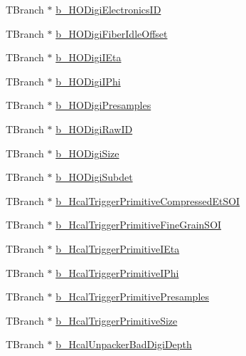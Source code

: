 \begin{DoxyCompactItemize}
\item 
T\+Branch $\ast$ \hyperlink{class_hcal_tuple_tree_a3e97d7440c8cafed91eb928ba1b76455}{b\+\_\+\+H\+O\+Digi\+Electronics\+I\+D}
\item 
T\+Branch $\ast$ \hyperlink{class_hcal_tuple_tree_a5e0d32424ae14cfd4499eeaaaeadf8a0}{b\+\_\+\+H\+O\+Digi\+Fiber\+Idle\+Offset}
\item 
T\+Branch $\ast$ \hyperlink{class_hcal_tuple_tree_ab0259ff430dca03ae316aedeaf2870f5}{b\+\_\+\+H\+O\+Digi\+I\+Eta}
\item 
T\+Branch $\ast$ \hyperlink{class_hcal_tuple_tree_a5311dcb724f54bb7398654b1f367aaca}{b\+\_\+\+H\+O\+Digi\+I\+Phi}
\item 
T\+Branch $\ast$ \hyperlink{class_hcal_tuple_tree_a04520870887cc734f0a01b82f13256b3}{b\+\_\+\+H\+O\+Digi\+Presamples}
\item 
T\+Branch $\ast$ \hyperlink{class_hcal_tuple_tree_aa09860c5b5f92fca14aec01d696674f8}{b\+\_\+\+H\+O\+Digi\+Raw\+I\+D}
\item 
T\+Branch $\ast$ \hyperlink{class_hcal_tuple_tree_a80b9b38ae544d61182fa930565e2d517}{b\+\_\+\+H\+O\+Digi\+Size}
\item 
T\+Branch $\ast$ \hyperlink{class_hcal_tuple_tree_ad03aeb309f6aebb9f82151259522bf11}{b\+\_\+\+H\+O\+Digi\+Subdet}
\item 
T\+Branch $\ast$ \hyperlink{class_hcal_tuple_tree_a739d95f6bac6fd9c895bbe289a03614c}{b\+\_\+\+Hcal\+Trigger\+Primitive\+Compressed\+Et\+S\+O\+I}
\item 
T\+Branch $\ast$ \hyperlink{class_hcal_tuple_tree_ad36994fe2634944e1e5055aab1d01f06}{b\+\_\+\+Hcal\+Trigger\+Primitive\+Fine\+Grain\+S\+O\+I}
\item 
T\+Branch $\ast$ \hyperlink{class_hcal_tuple_tree_a20ca342b1ff8340f87df92fc043f530a}{b\+\_\+\+Hcal\+Trigger\+Primitive\+I\+Eta}
\item 
T\+Branch $\ast$ \hyperlink{class_hcal_tuple_tree_a013a10f87ec84bdca82f079ea9c5f939}{b\+\_\+\+Hcal\+Trigger\+Primitive\+I\+Phi}
\item 
T\+Branch $\ast$ \hyperlink{class_hcal_tuple_tree_a59d56d4761c890340bc2cd9f842d3a12}{b\+\_\+\+Hcal\+Trigger\+Primitive\+Presamples}
\item 
T\+Branch $\ast$ \hyperlink{class_hcal_tuple_tree_a80e9be60bdf812e122948410b96af74b}{b\+\_\+\+Hcal\+Trigger\+Primitive\+Size}
\item 
T\+Branch $\ast$ \hyperlink{class_hcal_tuple_tree_ad75fffeafb23f44f750e2a8d78613d42}{b\+\_\+\+Hcal\+Unpacker\+Bad\+Digi\+Depth}
\item 

\end{DoxyCompactItemize}
